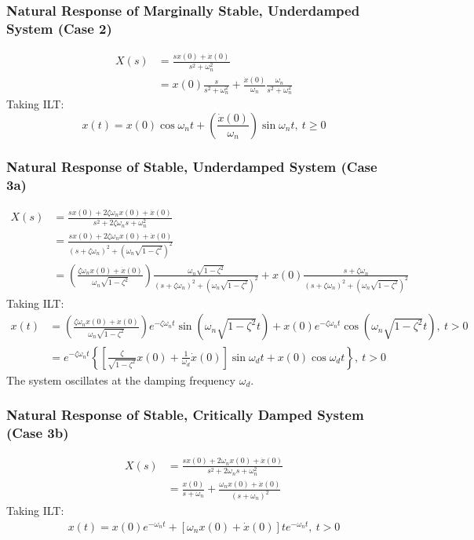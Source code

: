 \documentclass[a4paper]{article}
\begin{document}
\subsubsection{Natural Response of Marginally Stable, Underdamped System (Case 2)}
\begin{align*}
    X(s) &= \frac{sx(0)+\dot{x}(0)}{s^2+\omega_n^2}\\
    &= x(0)\frac{s}{s^2+\omega_n^2}+\frac{\dot{x}(0)}{\omega_n}\frac{\omega_n}{s^2+\omega_n^2}
\end{align*}
Taking ILT:
$$x(t) = x(0)\cos\omega_n t+\left(\frac{\dot{x}(0)}{\omega_n}\right)\sin\omega_n t,\ t\geq 0$$

\subsubsection{Natural Response of Stable, Underdamped System (Case 3a)}
\begin{align*}
    X(s) &= \frac{sx(0)+2\zeta\omega_n x(0)+\dot{x}(0)}{s^2+2\zeta\omega_n s+\omega_n^2}\\
    &= \frac{sx(0)+2\zeta\omega_n x(0)+\dot{x}(0)}{(s+\zeta\omega_n)^2+(\omega_n\sqrt{1-\zeta^2})^2}\\
    &= \left(\frac{\zeta\omega_n x(0)+\dot{x}(0)}{\omega_n\sqrt{1-\zeta^2}}\right)\frac{\omega_n\sqrt{1-\zeta^2}}{(s+\zeta\omega_n)^2+(\omega_n\sqrt{1-\zeta^2})^2} + x(0)\frac{s+\zeta\omega_n}{(s+\zeta\omega_n)^2+(\omega_n\sqrt{1-\zeta^2})^2}
\end{align*}
Taking ILT:
\begin{align*}
    x(t) &= \left(\frac{\zeta\omega_n x(0)+\dot{x}(0)}{\omega_n\sqrt{1-\zeta^2}}\right)e^{-\zeta\omega_n t}\sin(\omega_n\sqrt{1-\zeta^2}t)+x(0)e^{-\zeta\omega_n t}\cos(\omega_n\sqrt{1-\zeta^2}t),\ t > 0\\
    &= e^{-\zeta\omega_n t}\left\{\left[\frac{\zeta}{\sqrt{1-\zeta^2}}x(0)+\frac{1}{\omega_d}\dot x(0)\right]\sin\omega_d t + x(0)\cos\omega_d t\right\},\ t > 0
\end{align*}
The system oscillates at the damping frequency $\omega_d$.

\subsubsection{Natural Response of Stable, Critically Damped System (Case 3b)}
\begin{align*}
    X(s) &= \frac{sx(0)+2\omega_n x(0)+\dot{x}(0)}{s^2+2\omega_n s+\omega_n^2}\\
    &= \frac{x(0)}{s+\omega_n} + \frac{\omega_n x(0)+\dot{x}(0)}{(s+\omega_n)^2}
\end{align*}
Taking ILT:
\begin{align*}
    x(t) = x(0)e^{-\omega_n t}+\left[\omega_n x(0)+\dot{x}(0)\right]te^{-\omega_n t},\ t>0
\end{align*}
\end{document}
